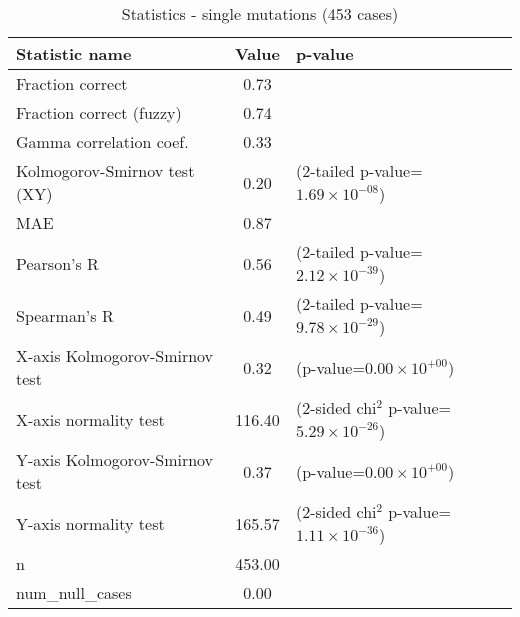 \documentclass[10pt, letterpaper, oneside, titlepage, landscape]{scrreprt}
\begin{document}
\begin{table}[H]\begin{center}
\begin{tabular}{ l S[table-format=3.2] l}
Statistic name & {Value} & p-value\\
\hline
Fraction correct & 0.73 & \\
Fraction correct (fuzzy) & 0.74 & \\
Gamma correlation coef. & 0.33 & \\
Kolmogorov-Smirnov test (XY) & 0.20 & (2-tailed p-value=$1.69\times10^{-08}$)\\
MAE & 0.87 & \\
Pearson's R & 0.56 & (2-tailed p-value=$2.12\times10^{-39}$)\\
Spearman's R & 0.49 & (2-tailed p-value=$9.78\times10^{-29}$)\\
X-axis Kolmogorov-Smirnov test & 0.32 & (p-value=$0.00\times10^{+00}$)\\
X-axis normality test & 116.40 & (2-sided chi$^{2}$ p-value=$5.29\times10^{-26}$)\\
Y-axis Kolmogorov-Smirnov test & 0.37 & (p-value=$0.00\times10^{+00}$)\\
Y-axis normality test & 165.57 & (2-sided chi$^{2}$ p-value=$1.11\times10^{-36}$)\\
n & 453.00 & \\
num\_null\_cases & 0.00 & \\
\end{tabular}
\caption{Statistics - single mutations (453 cases)}
\end{center}\end{table}
\end{document}
